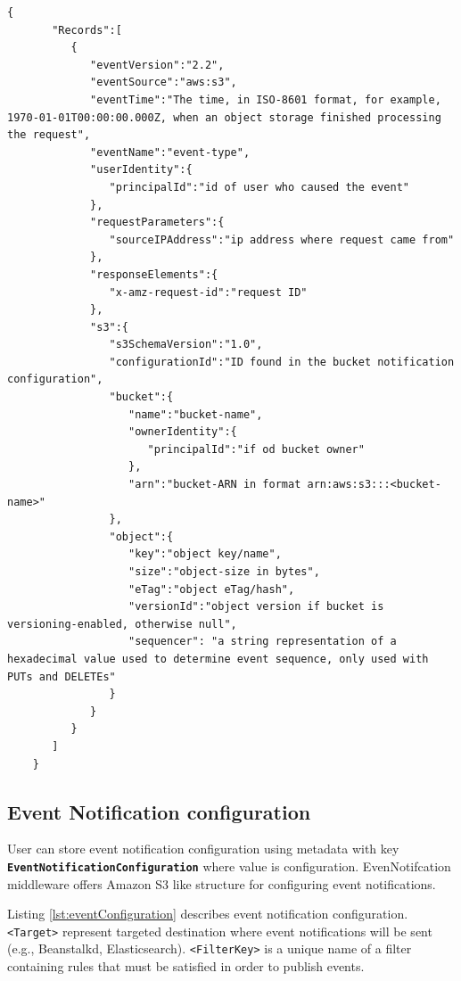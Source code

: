     \begin{minipage}{\linewidth}
    \begin{lstlisting}[style=jsonStyle, caption=Amazon S3 structure of event notification published by EventNotification middleware., label=lst:eventStructureS3]
    {
       "Records":[
          {
             "eventVersion":"2.2",
             "eventSource":"aws:s3",
             "eventTime":"The time, in ISO-8601 format, for example, 1970-01-01T00:00:00.000Z, when an object storage finished processing the request",
             "eventName":"event-type",
             "userIdentity":{
                "principalId":"id of user who caused the event"
             },
             "requestParameters":{
                "sourceIPAddress":"ip address where request came from"
             },
             "responseElements":{
                "x-amz-request-id":"request ID"
             },
             "s3":{
                "s3SchemaVersion":"1.0",
                "configurationId":"ID found in the bucket notification configuration",
                "bucket":{
                   "name":"bucket-name",
                   "ownerIdentity":{
                      "principalId":"if od bucket owner"
                   },
                   "arn":"bucket-ARN in format arn:aws:s3:::<bucket-name>"
                },
                "object":{
                   "key":"object key/name",
                   "size":"object-size in bytes",
                   "eTag":"object eTag/hash",
                   "versionId":"object version if bucket is versioning-enabled, otherwise null",
                   "sequencer": "a string representation of a hexadecimal value used to determine event sequence, only used with PUTs and DELETEs"
                }
             }
          }
       ]
    }
    \end{lstlisting}
    \end{minipage}

    \subsection{Event Notification configuration}
    User can store event notification configuration using metadata with key \textbf{\texttt{\newline EventNotificationConfiguration}} where value is configuration.
    EvenNotifcation middleware offers Amazon S3 like structure for configuring event notifications.

    Listing \ref{lst:eventConfiguration} describes event notification configuration. \texttt{<Target>} represent targeted destination where event notifications will be sent (e.g., Beanstalkd, Elasticsearch). \texttt{<FilterKey>} is a unique name of a filter containing rules that must be satisfied in order to publish events.

